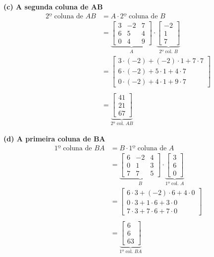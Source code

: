 \documentclass[a4paper,12pt]{article}
\begin{document}
\textbf{(c) A segunda coluna de AB}
\begin{align*}
    \text{2º coluna de } AB &= A \cdot \text{2º coluna de }B\\
    &=
    \underbrace{
    \begin{bmatrix}
        3 & -2 & 7 \\
        6 &  5 & 4 \\
        0 &  4 & 9
    \end{bmatrix}}_{A}
    \cdot
    \underbrace{
    \begin{bmatrix}
        -2 \\
         1 \\
         7
    \end{bmatrix}}_{\text{2º col. }B} \\
    &=
    \begin{bmatrix}
        3 \cdot (-2) + (-2) \cdot 1 + 7 \cdot 7 \\
        6 \cdot (-2) +   5  \cdot 1 + 4 \cdot 7 \\
        0 \cdot (-2) +   4  \cdot 1 + 9 \cdot 7
    \end{bmatrix}\\ \\
    &=
    \underbrace{
    \begin{bmatrix}
        41 \\
        21 \\
        67
    \end{bmatrix}}_{\text{2º col. }AB}
\end{align*}

\textbf{(d) A primeira coluna de BA}
\begin{align*}
    \text{1º coluna de } BA &= B \cdot \text{1º coluna de }A\\
    &=
    \underbrace{
    \begin{bmatrix}
        6 & -2 & 4 \\
        0 & 1 & 3 \\
        7 & 7 & 5
    \end{bmatrix}}_{B}
    \cdot
    \underbrace{
    \begin{bmatrix}
        3 \\
        6 \\
        0
    \end{bmatrix}}_{\text{1º col. }A} \\
    &=
    \begin{bmatrix}
        6 \cdot 3 + (-2) \cdot 6 + 4 \cdot 0 \\
        0 \cdot 3 +   1  \cdot 6 + 3 \cdot 0 \\
        7 \cdot 3 +   7  \cdot 6 + 7 \cdot 0
    \end{bmatrix} \\ \\
    &=
    \underbrace{
    \begin{bmatrix}
        6\\
        6\\
        63
    \end{bmatrix}}_{\text{1º col. }BA}
\end{align*}
\end{document}
